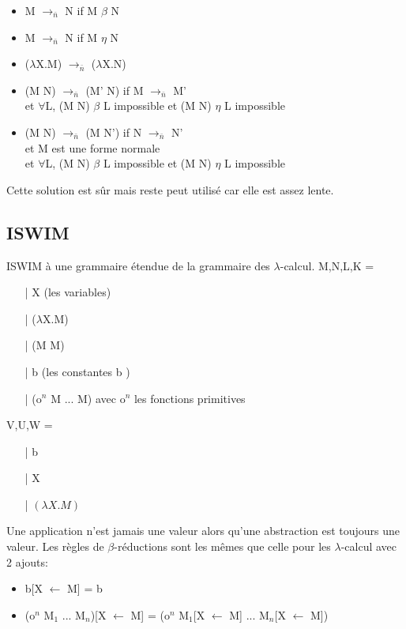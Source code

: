 \documentclass[10pt,a4paper]{article}
\begin{document}
				\begin{itemize}
					\item M $\longrightarrow_{\bar{n}}$ N if M $\beta$ N
					\item M $\longrightarrow_{\bar{n}}$ N if M $\eta$ N
					\item ($\lambda$X.M) $\longrightarrow_{\bar{n}}$ ($\lambda$X.N)
					\item (M N) $\longrightarrow_{\bar{n}}$ (M' N) if M $\longrightarrow_{\bar{n}}$ M'
					\\ et $\forall$L, (M N) $\beta$ L impossible et (M N) $\eta$ L impossible
					\item (M N) $\longrightarrow_{\bar{n}}$ (M N') if N $\longrightarrow_{\bar{n}}$ N'
					\\ et M est une forme normale
					\\ et  $\forall$L, (M N) $\beta$ L impossible et (M N) $\eta$ L impossible
				\end{itemize}
				
				Cette solution est s\^{u}r mais reste peut utilis\'{e} car elle est assez lente. 
			\newpage
			\subsection{ISWIM}	
			
				ISWIM à une grammaire étendue de la grammaire des $\lambda$-calcul.
				\smallbreak
				M,N,L,K =
				\begin{itemize}
					\item[|] X (les variables)
					\item[|] ($\lambda$X.M)
					\item[|] (M M)
					\item[|] b (les constantes b )
					\item[|] (o$^{n}$ M ... M) avec o$^{n}$ les fonctions primitives
				\end{itemize}
				\medbreak
				
				V,U,W =
				\begin{itemize}
					\item[|] b
					\item[|] X
					\item[|] $(\lambda X.M)$
				\end{itemize}
				
				
				Une application n'est jamais une valeur alors qu'une abstraction est toujours une valeur.
				\medbreak
				Les règles de $\beta$-réductions sont les mêmes que celle pour les $\lambda$-calcul avec 2 ajouts:
				\begin{itemize}
					\item b[X $\longleftarrow$ M] = b
					\item (o$^{n}$ M$_{1}$ ... M$_{n}$)[X $\longleftarrow$ M] = (o$^{n}$ M$_{1}$[X $\longleftarrow$ M] ... M$_{n}$[X $\longleftarrow$ M])
				\end{itemize}
				
\end{document}
